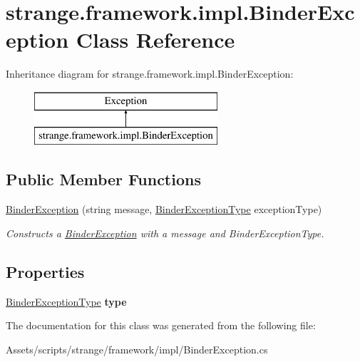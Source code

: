 \hypertarget{classstrange_1_1framework_1_1impl_1_1_binder_exception}{\section{strange.\-framework.\-impl.\-Binder\-Exception Class Reference}
\label{classstrange_1_1framework_1_1impl_1_1_binder_exception}
}
Inheritance diagram for strange.\-framework.\-impl.\-Binder\-Exception\-:\begin{figure}[H]
\begin{center}
\leavevmode
\includegraphics[height=2.000000cm]{classstrange_1_1framework_1_1impl_1_1_binder_exception}
\end{center}
\end{figure}
\subsection*{Public Member Functions}
\begin{DoxyCompactItemize}
\item 
\hypertarget{classstrange_1_1framework_1_1impl_1_1_binder_exception_acabaa6f293cca63d97cc417e454c3953}{\hyperlink{classstrange_1_1framework_1_1impl_1_1_binder_exception_acabaa6f293cca63d97cc417e454c3953}{Binder\-Exception} (string message, \hyperlink{namespacestrange_1_1framework_1_1api_ae9308e863579d2ca38f2729e1104dac9}{Binder\-Exception\-Type} exception\-Type)}\label{classstrange_1_1framework_1_1impl_1_1_binder_exception_acabaa6f293cca63d97cc417e454c3953}

\begin{DoxyCompactList}\small\item\em Constructs a \hyperlink{classstrange_1_1framework_1_1impl_1_1_binder_exception}{Binder\-Exception} with a message and Binder\-Exception\-Type. \end{DoxyCompactList}\end{DoxyCompactItemize}
\subsection*{Properties}
\begin{DoxyCompactItemize}
\item 
\hypertarget{classstrange_1_1framework_1_1impl_1_1_binder_exception_a32626a8fc91be29732b6b54cf6942fc6}{\hyperlink{namespacestrange_1_1framework_1_1api_ae9308e863579d2ca38f2729e1104dac9}{Binder\-Exception\-Type} {\bfseries type}}\label{classstrange_1_1framework_1_1impl_1_1_binder_exception_a32626a8fc91be29732b6b54cf6942fc6}

\end{DoxyCompactItemize}


The documentation for this class was generated from the following file\-:\begin{DoxyCompactItemize}
\item 
Assets/scripts/strange/framework/impl/Binder\-Exception.\-cs\end{DoxyCompactItemize}
